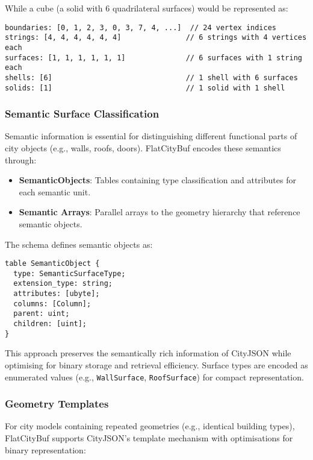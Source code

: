 While a cube (a solid with 6 quadrilateral surfaces) would be represented as:

\begin{verbatim}
boundaries: [0, 1, 2, 3, 0, 3, 7, 4, ...]  // 24 vertex indices
strings: [4, 4, 4, 4, 4, 4]               // 6 strings with 4 vertices each
surfaces: [1, 1, 1, 1, 1, 1]              // 6 surfaces with 1 string each
shells: [6]                               // 1 shell with 6 surfaces
solids: [1]                               // 1 solid with 1 shell
\end{verbatim}

\subsubsection{Semantic Surface Classification}
\label{subsubsec:semantic_surface_classification}

Semantic information is essential for distinguishing different functional parts of city objects (e.g., walls, roofs, doors). FlatCityBuf encodes these semantics through:

\begin{itemize}
    \item \textbf{SemanticObjects}: Tables containing type classification and attributes for each semantic unit.
    \item \textbf{Semantic Arrays}: Parallel arrays to the geometry hierarchy that reference semantic objects.
\end{itemize}

The schema defines semantic objects as:

\begin{verbatim}
table SemanticObject {
  type: SemanticSurfaceType;
  extension_type: string;
  attributes: [ubyte];
  columns: [Column];
  parent: uint;
  children: [uint];
}
\end{verbatim}

This approach preserves the semantically rich information of CityJSON while optimising for binary storage and retrieval efficiency. Surface types are encoded as enumerated values (e.g., \texttt{WallSurface}, \texttt{RoofSurface}) for compact representation.

\subsubsection{Geometry Templates}
\label{subsubsec:geometry_templates}

For city models containing repeated geometries (e.g., identical building types), FlatCityBuf supports CityJSON's template mechanism with optimisations for binary representation:

